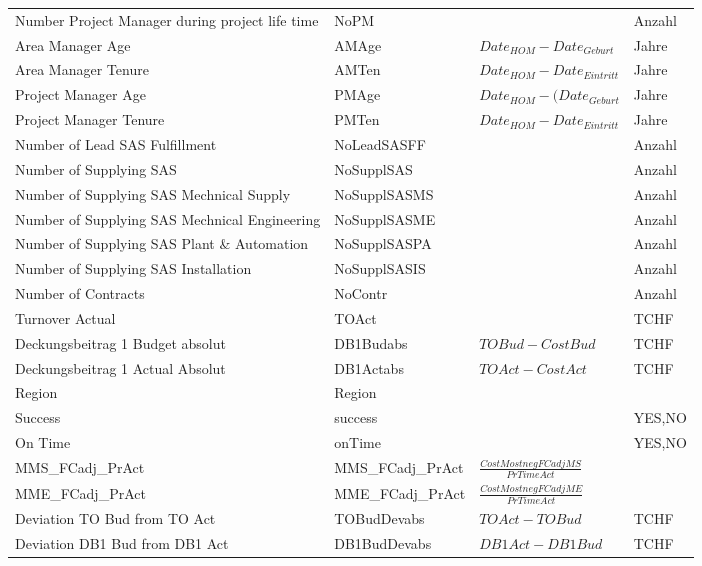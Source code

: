 \documentclass[11pt]{article}
\begin{document}
\begin{landscape}
\begin{center}
\begin{longtable}{p{6cm}|p{4cm}|p{6cm}|p{3cm}}
		Number Project Manager during project life time & NoPM  &       & \multicolumn{1}{l}{Anzahl} \\
		Area Manager Age & AMAge & $Date_{HOM}-Date_{Geburt}$ & \multicolumn{1}{l}{Jahre} \\
		Area Manager Tenure & AMTen & $Date_{HOM}-Date_{Eintritt}$ & \multicolumn{1}{l}{Jahre} \\
		Project Manager Age & PMAge & $Date_{HOM}-(Date_{Geburt}$ & \multicolumn{1}{l}{Jahre} \\
		Project Manager Tenure & PMTen & $Date_{HOM}-Date_{Eintritt}$ & \multicolumn{1}{l}{Jahre} \\
		Number of Lead SAS Fulfillment & NoLeadSASFF &       & \multicolumn{1}{l}{Anzahl} \\
		Number of Supplying SAS & NoSupplSAS &       & \multicolumn{1}{l}{Anzahl} \\
		Number of Supplying SAS Mechnical Supply & NoSupplSASMS &       & \multicolumn{1}{l}{Anzahl} \\
		Number of Supplying SAS Mechnical Engineering & NoSupplSASME &       & \multicolumn{1}{l}{Anzahl} \\
		Number of Supplying SAS Plant \& Automation & NoSupplSASPA &       & \multicolumn{1}{l}{Anzahl} \\
		Number of Supplying SAS Installation & NoSupplSASIS &       & \multicolumn{1}{l}{Anzahl} \\
		Number of Contracts & NoContr &       & \multicolumn{1}{l}{Anzahl} \\
		Turnover Actual & TOAct &       & \multicolumn{1}{l}{TCHF} \\
		Deckungsbeitrag 1 Budget absolut & DB1Budabs & $TOBud-CostBud$ & \multicolumn{1}{l}{TCHF} \\
		Deckungsbeitrag 1 Actual Absolut & DB1Actabs & $TOAct-CostAct$ & \multicolumn{1}{l}{TCHF} \\
		Region & Region &       &  \\
		Success & success &       & {YES,NO} \\
		On Time & onTime &       & {YES,NO} \\
		MMS\_FCadj\_PrAct & MMS\_FCadj\_PrAct & $\frac{CostMostnegFCadjMS}{PrTimeAct}$ & \\
		MME\_FCadj\_PrAct & MME\_FCadj\_PrAct & $\frac{CostMostnegFCadjME}{PrTimeAct}$ &  \\
		Deviation TO Bud from TO Act & TOBudDevabs & $TOAct-TOBud$ & TCHF \\
		Deviation DB1 Bud from DB1 Act & DB1BudDevabs & $DB1Act-DB1Bud$ & TCHF \\

\end{longtable}
\end{center}
\end{landscape}
\end{document}
